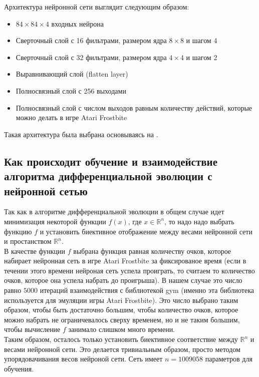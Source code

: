 \documentclass[12pt]{article}
\begin{document}
            Архитектура нейронной сети выглядит следующим образом:
            \begin{itemize}
                \item $84 \times 84 \times 4$ входных нейрона
                \item Сверточный слой с 16 фильтрами, размером ядра $8 \times 8$ и шагом 4
                \item Сверточный слой с 32 фильтрами, размером ядра $4 \times 4$ и шагом 2
                \item Выравнивающий слой (flatten layer)
                \item Полносвязный слой с 256 выходами
                \item Полносвязный слой с числом выходов равным количеству действий, которые можно делать в игре Atari Frostbite
            \end{itemize}

            Такая архитектура была выбрана основываясь на \cite{uber}.

    \subsection{Как происходит обучение и взаимодействие алгоритма дифференциальной эволюции с нейронной сетью}
        Так как в алгоритме дифференциальной эволюции в общем случае идет минимизация некоторой функции $f(x)$, где $x \in \mathbb{R}^n$, то надо надо выбрать функцию $f$ и установить биективное отображение между весами нейронной сети и простанством $\mathbb{R}^n$. \\

        В качестве функции $f$ выбрана функция равная количеству очков, которое набирает нейронная сеть в игре Atari Frostbite за фиксированое время (если в течении этого времени нейроная сеть успела проиграть, то считаем то количество очков, которое она успела набрать до проигрыша). В нашем случае это число равно $5000$ итераций взаимодействия с библиотекой gym (именно эта библиотека используется для эмуляции игры Atari Frostbite). Это число выбрано таким образом, чтобы быть достаточно большим, чтобы количество очков, которое можно набрать не ограничевалось сверху временем, но и не таким большим, чтобы вычисление $f$ занимало слишком много времени. \\

        Таким образом, осталось только установить биективное соответствие между $\mathbb{R}^n$ и весами нейронной сети. Это делается тривиальным образом, просто методом упорядовачивания весов нейроной сети. Сеть имеет $n=1009058$ параметров для обучения. \\
\end{document}

